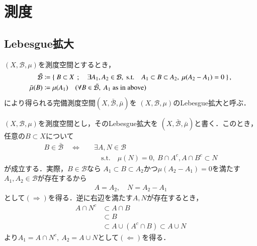 \section{測度}
	\subsection{Lebesgue拡大}
		\begin{screen}
			\begin{dfn}[Lebesgue拡大]
				$(X,\mathcal{B},\mu)$を測度空間とするとき，
				\begin{align}
					\bar{\mathcal{B}} &\coloneqq
					\Set{B \subset X}{\exists A_1,A_2 \in \mathcal{B},\ \mbox{s.t.}\quad A_1 \subset B \subset A_2,\ \mu(A_2 - A_1)=0 }, \\
					\bar{\mu}(B) &\coloneqq \mu(A_1) \quad (\forall B \in \bar{\mathcal{B}},\ \mbox{$A_1$ as in above})
				\end{align}
				により得られる完備測度空間$(X,\bar{\mathcal{B}},\bar{\mu})$を
				$(X,\mathcal{B},\mu)$のLebesgue拡大と呼ぶ．
			\end{dfn}
		\end{screen}
		$(X,\mathcal{B},\mu)$を測度空間とし，そのLebesgue拡大を
		$(X,\bar{\mathcal{B}},\bar{\mu})$と書く．このとき，任意の$B \subset X$について
		\begin{align}
			B \in \bar{\mathcal{B}}
			\quad \Leftrightarrow \quad
			&\exists A,N \in \mathcal{B} \\
			&\quad \mbox{s.t.}\quad \mu(N)=0,
			\ B \cap A^c, A \cap B^c \subset N
			\label{eq:appendix_Lebesgue_expansion_note_1}
		\end{align}
		が成立する．実際，$B \in \mathcal{B}$なら
		$A_1 \subset B \subset A_2$かつ$\mu(A_2 - A_1) = 0$を満たす$A_1,A_2 \in \mathcal{B}$が存在するから
		\begin{align}
			A = A_2, \quad N = A_2 - A_1
		\end{align}
		として$(\Rightarrow)$を得る．逆に右辺を満たす$A,N$が存在するとき，
		\begin{align}
			A \cap N^c &\subset A \cap B \\
			&\subset B \\
			&\subset A \cup (A^c \cap B)
			\subset A \cup N
		\end{align}
		より$A_1 = A\cap N^c,\ A_2 = A \cup N$として$(\Leftarrow)$を得る．
	
